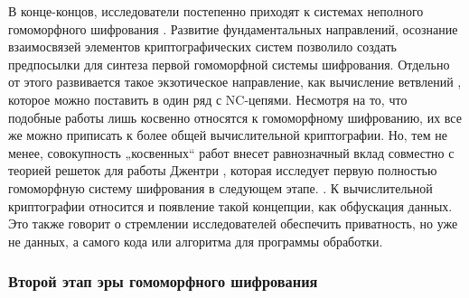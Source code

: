      В конце-концов, исследователи постепенно приходят к системах неполного гомоморфного шифрования \cite{LatticeHomoVector-08} \cite{DamgardJurik-03} \cite{TOpMult-08} \cite{HomoNewApproach-08}. \color{Red}Развитие фундаментальных направлений, осознание взаимосвязей элементов криптографических систем позволило создать предпосылки для синтеза первой гомоморфной системы шифрования. \color{LimeGreen}Отдельно от этого развивается такое экзотическое направление, как вычисление ветвлений \cite{IshaiPaskinBranches-07}, которое можно поставить в один ряд с NC-цепями. Несмотря на то, что подобные работы лишь косвенно относятся к гомоморфному шифрованию, их все же можно приписать к более общей вычислительной криптографии. Но,  тем не менее, совокупность „косвенных“ работ внесет равнозначный вклад совместно с теорией решеток для работы Джентри \cite{Jentry-09}, которая исследует первую полностью гомоморфную систему шифрования в следующем этапе. \cite{DijkHomoIntegers-10}. К вычислительной криптографии относится и появление такой концепции, как обфускация данных. Это также говорит о стремлении  исследователей обеспечить приватность, но уже не данных, а самого кода или алгоритма для программы обработки. \cite{OnObfImpossible-01} \cite{IntervalObfuscation-09}\par

    \subsubsection{Второй этап эры гомоморфного шифрования}

